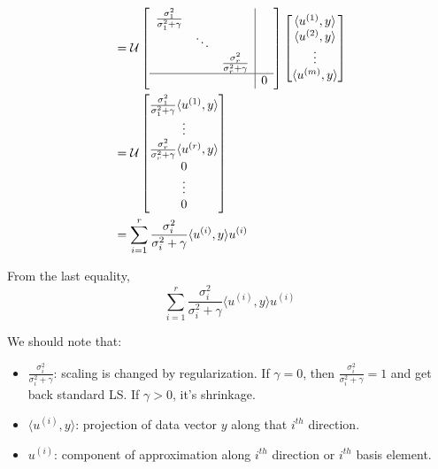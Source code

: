 \begin{align*}
&= \mathcal{U}
\left[
\begin{array}{c|c}
\begin{matrix}
\frac{\sigma_1^2}{\sigma_1^2+\gamma} & &\\
&\ddots&\\
&&\frac{\sigma_r^2}{\sigma_r^2+\gamma}
\end{matrix}&  \\ \hline 
& 0
\end{array}
\right]
\begin{bmatrix}
\langle u^{(1)}, y\rangle\\
\langle u^{(2)}, y\rangle\\
\vdots\\
\langle u^{(m)}, y\rangle
\end{bmatrix}\\
&=\mathcal{U}
\begin{bmatrix}
\frac{\sigma_1^2}{\sigma_1^2+\gamma}\langle u^{(1)}, y\rangle\\
\vdots\\
\frac{\sigma_r^2}{\sigma_r^2+\gamma}\langle u^{(r)}, y\rangle\\
0\\
\vdots\\
0
\end{bmatrix}\\
&= \sum^r_{i=1}\frac{\sigma_i^2}{\sigma_i^2 + \gamma}\langle u^{(i)}, y\rangle u^{(i)}
\end{align*}

From the last equality,
\begin{equation*}
\sum^r_{i=1}\frac{\sigma_i^2}{\sigma_i^2 + \gamma}\langle u^{(i)}, y\rangle u^{(i)}
\end{equation*}

We should note that:
\begin{itemize}
	\item $\frac{\sigma_i^2}{\sigma_i^2 + \gamma}$: scaling is changed by regularization. If $\gamma = 0$, then  $\frac{\sigma_i^2}{\sigma_i^2 + \gamma} = 1$ and get back standard LS. If $\gamma > 0$, it's shrinkage. 
	
	\item $\langle u^{(i)}, y\rangle $: projection of data vector $y$ along that $i^{th}$ direction. 
	
	\item $u^{(i)}$: component of approximation along $i^{th}$ direction or $i^{th}$ basis element. 
\end{itemize}



